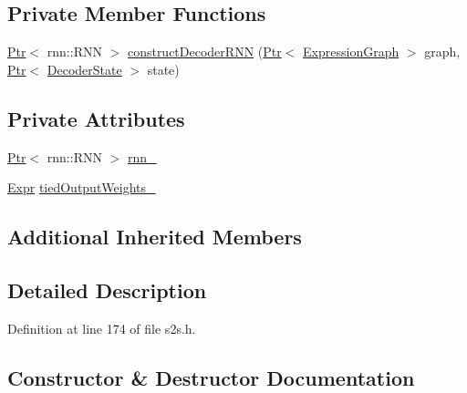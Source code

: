\subsection*{Private Member Functions}
\begin{DoxyCompactItemize}
\item 
\hyperlink{namespacemarian_ad1a373be43a00ef9ce35666145137b08}{Ptr}$<$ rnn\+::\+R\+NN $>$ \hyperlink{classmarian_1_1DecoderS2S_adad1c24cac6a5c5f2a679df18f3c0f58}{construct\+Decoder\+R\+NN} (\hyperlink{namespacemarian_ad1a373be43a00ef9ce35666145137b08}{Ptr}$<$ \hyperlink{classmarian_1_1ExpressionGraph}{Expression\+Graph} $>$ graph, \hyperlink{namespacemarian_ad1a373be43a00ef9ce35666145137b08}{Ptr}$<$ \hyperlink{classmarian_1_1DecoderState}{Decoder\+State} $>$ state)
\end{DoxyCompactItemize}
\subsection*{Private Attributes}
\begin{DoxyCompactItemize}
\item 
\hyperlink{namespacemarian_ad1a373be43a00ef9ce35666145137b08}{Ptr}$<$ rnn\+::\+R\+NN $>$ \hyperlink{classmarian_1_1DecoderS2S_aa4292be54117f5fc7bee31fac549a93c}{rnn\+\_\+}
\item 
\hyperlink{namespacemarian_a498d8baf75b754011078b890b39c8e12}{Expr} \hyperlink{classmarian_1_1DecoderS2S_afdcd53fd8c14663b24af51651e8e3e6e}{tied\+Output\+Weights\+\_\+}
\end{DoxyCompactItemize}
\subsection*{Additional Inherited Members}


\subsection{Detailed Description}


Definition at line 174 of file s2s.\+h.



\subsection{Constructor \& Destructor Documentation}
